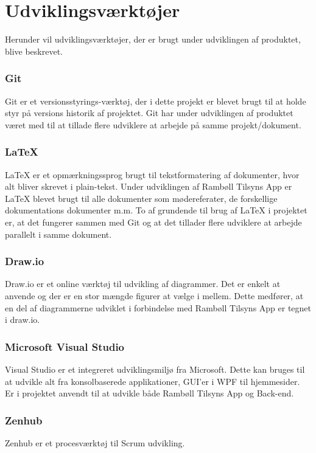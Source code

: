 \chapter{Udviklingsværktøjer} \label{sec:Udviklingsvaerktoejer}
Herunder vil udviklingsværktøjer, der er brugt under udviklingen af 
produktet, blive beskrevet.

\subsection*{Git}
Git\cite{GitRef} er et versionsstyrings-værktøj, der i dette projekt er 
blevet brugt til at holde styr på versions historik af projektet. Git har under 
udviklingen af produktet været med til at tillade flere udviklere at 
arbejde på samme projekt/dokument.

\subsection*{\LaTeX}
\LaTeX \cite{LatexRef} er et opmærkningssprog brugt til tekstformatering af 
dokumenter, hvor alt bliver skrevet i plain-tekst. Under udviklingen af 
Rambøll Tilsyns App er LaTeX blevet brugt til alle dokumenter som 
mødereferater, de forskellige dokumentations dokumenter m.m. To af grundende til brug af LaTeX i 
projektet er, at det fungerer sammen med Git og at det tillader flere 
udviklere at arbejde parallelt i samme dokument.

\subsection*{Draw.io}
Draw.io\cite{Draw.io} er et online værktøj til udvikling af diagrammer. 
Det er enkelt at anvende og der er en stor mængde figurer at vælge i mellem. Dette medfører, at en del af diagrammerne udviklet i forbindelse med Rambøll Tilsyns App er tegnet i draw.io.

\subsection*{Microsoft Visual Studio}
Visual Studio\cite{VisualStudio} er et integreret udviklingsmiljø fra 
Microsoft. Dette kan bruges til at udvikle alt fra konsolbaserede 
applikationer, GUI'er i WPF til hjemmesider. Er i projektet anvendt til at 
udvikle både Rambøll Tilsyns App og Back-end.

\subsection*{Zenhub}
Zenhub \cite{Zenhub} er et procesværktøj til Scrum udvikling.

